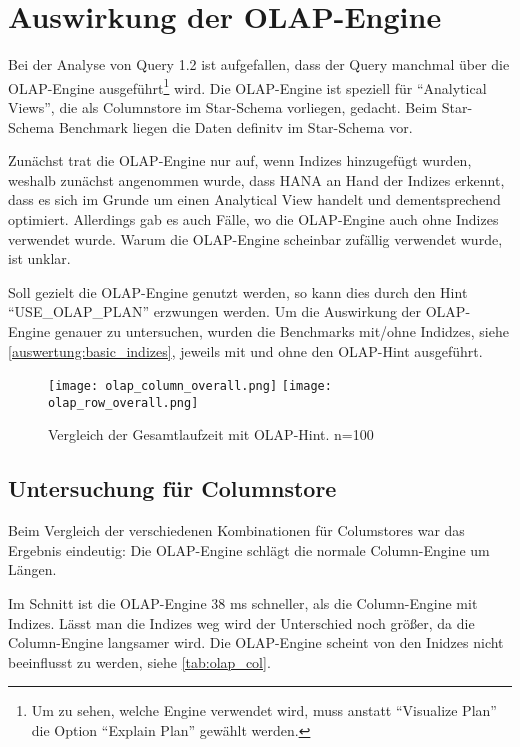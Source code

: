 \section{Auswirkung der OLAP-Engine}\label{auswertung:olap}
Bei der Analyse von Query 1.2 ist aufgefallen, dass der Query manchmal über die OLAP-Engine 
ausgeführt\footnote{Um zu sehen, welche Engine verwendet wird, muss anstatt \enquote{Visualize Plan} die Option \enquote{Explain Plan} gewählt werden.} wird. 
Die OLAP-Engine ist speziell für \enquote{Analytical Views}, die als Columnstore im Star-Schema vorliegen, gedacht.\cite{olap,olap2} Beim Star-Schema Benchmark liegen die Daten definitv im Star-Schema vor.


Zunächst trat die OLAP-Engine nur auf, wenn Indizes hinzugefügt wurden, weshalb zunächst angenommen wurde, dass
 HANA an Hand der Indizes erkennt, dass es sich im Grunde um einen Analytical View handelt und dementsprechend optimiert.
Allerdings gab es auch Fälle, wo die OLAP-Engine auch ohne Indizes verwendet wurde. Warum die OLAP-Engine scheinbar zufällig verwendet wurde, ist unklar.

Soll gezielt die OLAP-Engine genutzt werden, so kann dies durch den Hint \enquote{USE\_OLAP\_PLAN} erzwungen werden.\cite{olap3,olap5}
Um die Auswirkung der OLAP-Engine genauer zu untersuchen, wurden die Benchmarks mit/ohne Indidzes, siehe \autoref{auswertung:basic_indizes}, jeweils mit und ohne den OLAP-Hint ausgeführt.


\begin{figure}[H]
    \centering
    \texttt{[image: olap\_column\_overall.png]}
    \texttt{[image: olap\_row\_overall.png]}
    \caption{Vergleich der Gesamtlaufzeit mit OLAP-Hint. n=100}
	\label{fig:olap_overall}
\end{figure}

\subsection{Untersuchung für Columnstore}
Beim Vergleich der verschiedenen Kombinationen für Columstores war das Ergebnis eindeutig: Die OLAP-Engine schlägt die normale Column-Engine um Längen.

Im Schnitt ist die OLAP-Engine 38 ms schneller, als die Column-Engine mit Indizes. Lässt man die Indizes weg wird der Unterschied noch größer, da die Column-Engine langsamer wird.
 Die OLAP-Engine scheint von den Inidzes nicht beeinflusst zu werden, siehe \autoref{tab:olap_col}.

